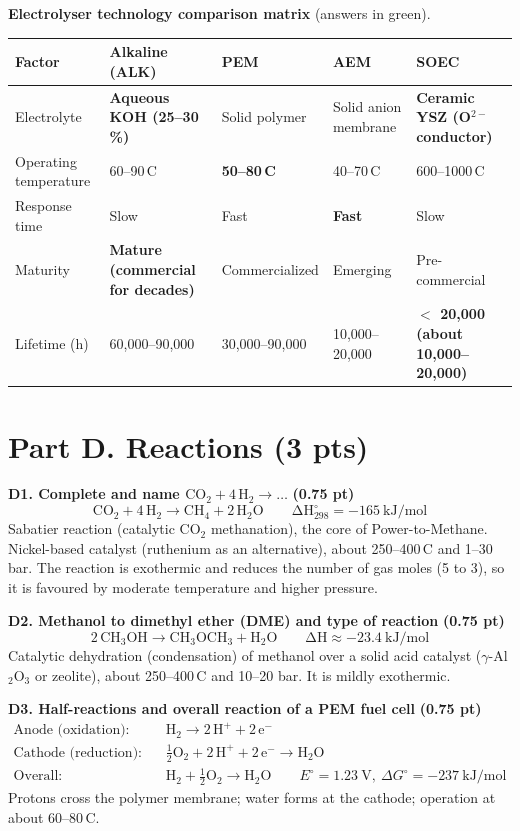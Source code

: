 \documentclass[11pt,a4paper]{article}
\newcommand{\degC}{\,\textdegree C}
\newcommand{\fillin}[1]{\textcolor{ans}{\textbf{#1}}}
\newcommand{\pts}[1]{\hfill{\normalsize\textbf{(#1)}}}
\newcommand{\rxn}[1]{\[\mathrm{#1}\]}
\begin{document}
\textbf{Electrolyser technology comparison matrix} (answers in green).

{\small
\renewcommand{\arraystretch}{1.35}
\begin{tabularx}{\linewidth}{@{}>{\raggedright\arraybackslash}p{3.2cm}YYYY@{}}
\toprule
\textbf{Factor} & \textbf{Alkaline (ALK)} & \textbf{PEM} & \textbf{AEM} & \textbf{SOEC}\\
\midrule
Electrolyte & \fillin{Aqueous KOH (25--30\,\%)} & Solid polymer & Solid anion membrane & \fillin{Ceramic YSZ (O$^{2-}$ conductor)}\\
Operating temperature & 60--90\degC & \fillin{50--80\degC} & 40--70\degC & 600--1000\degC\\
Response time & Slow & Fast & \fillin{Fast} & Slow\\
Maturity & \fillin{Mature (commercial for decades)} & Commercialized & Emerging & Pre-commercial\\
Lifetime (h) & 60,000--90,000 & 30,000--90,000 & 10,000--20,000 & \fillin{$<$ 20,000 (about 10,000--20,000)}\\
\bottomrule
\end{tabularx}}

\section{Part D. Reactions \pts{3 pts}}

\textbf{D1. Complete and name $\mathrm{CO_2 + 4\,H_2 \longrightarrow \dots}$} \pts{0.75 pt}
\rxn{CO_2 + 4\,H_2 \longrightarrow CH_4 + 2\,H_2O \qquad \Delta H^\circ_{298} = -165\ kJ/mol}
Sabatier reaction (catalytic CO$_2$ methanation), the core of Power-to-Methane. Nickel-based catalyst
(ruthenium as an alternative), about 250--400\degC{} and 1--30 bar. The reaction is exothermic and reduces the number
of gas moles (5 to 3), so it is favoured by moderate temperature and higher pressure.

\textbf{D2. Methanol to dimethyl ether (DME) and type of reaction} \pts{0.75 pt}
\rxn{2\,CH_3OH \longrightarrow CH_3OCH_3 + H_2O \qquad \Delta H \approx -23.4\ kJ/mol}
Catalytic dehydration (condensation) of methanol over a solid acid catalyst ($\gamma$-Al$_2$O$_3$ or zeolite),
about 250--400\degC{} and 10--20 bar. It is mildly exothermic.

\textbf{D3. Half-reactions and overall reaction of a PEM fuel cell} \pts{0.75 pt}
\begin{align*}
\text{Anode (oxidation):}\quad & \mathrm{H_2 \longrightarrow 2\,H^+ + 2\,e^-}\\
\text{Cathode (reduction):}\quad & \mathrm{\tfrac{1}{2}O_2 + 2\,H^+ + 2\,e^- \longrightarrow H_2O}\\
\text{Overall:}\quad & \mathrm{H_2 + \tfrac{1}{2}O_2 \longrightarrow H_2O} \qquad E^\circ = 1.23\ \mathrm{V},\ \Delta G^\circ = -237\ \mathrm{kJ/mol}
\end{align*}
Protons cross the polymer membrane; water forms at the cathode; operation at about 60--80\degC.
\end{document}
